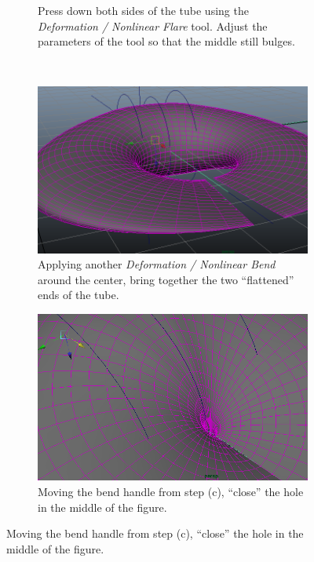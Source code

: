 \documentclass[11pt,            %
               a4paper,         %
               oneside,         %
               DIV12,           %
               fleqn,           %
               halfparskip,     %
               nochapterprefix, %
              ]{scrartcl} %
\theoremstyle{definition}
\begin{document}
\begin{landscape}
\begin{figure}[p]
\begin{subfigure}[t]{10cm}
    \caption{Press down both sides of the tube using the
      \emph{Deformation / Nonlinear Flare} tool. Adjust the parameters
      of the tool so that the middle still bulges.}
  \end{subfigure}\\[2em]
  \begin{subfigure}[t]{10cm}
    \centering
    \includegraphics[width=\textwidth]{screenshots/construction03.png}
    \caption{Applying another \emph{Deformation / Nonlinear Bend}
      around the center, bring together the two “flattened” ends of
      the tube.}
  \end{subfigure}
  \hspace{2em}
  \begin{subfigure}[t]{10cm}
    \centering
    \includegraphics[width=\textwidth]{screenshots/construction04.png}
    \caption{Moving the bend handle from step (c),
      “close” the hole in the middle of the figure.}
  \end{subfigure}
\end{figure}
\end{landscape}
\end{document}
